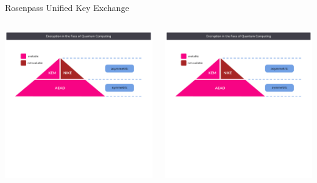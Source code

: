 \begin{frame}{Rosenpass Unified Key Exchange}
  \hypertarget{rosenpass-flow-unified}{}
  \centering
  \begin{columns}[fullwidth,c]
    \begin{column}{.6\linewidth}
      \includegraphics[width=1.3\linewidth,page=7,clip=true,trim=1cm 4cm 0cm 2cm]{graphics/rosenpass-key-exchanges-nike-kem.pdf}
    \end{column}%

    \begin{column}{.4\linewidth}
      \includegraphics[width=\linewidth,page=5,clip=true,trim=3cm 7cm 0cm 3.5cm]{graphics/rosenpass-key-exchanges-nike-kem.pdf}
    \end{column}
  \end{columns}
\end{frame}
